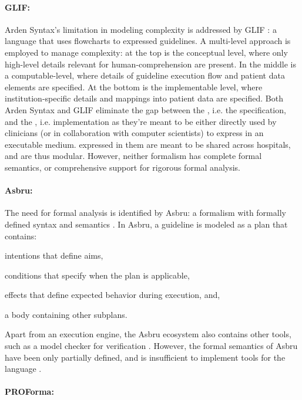 \paragraph{GLIF:}

Arden Syntax's limitation in modeling complexity is addressed by
GLIF \cite{BoxwalaJBI04}: a language that uses flowcharts to expressed
guidelines. A multi-level approach is
employed to manage complexity: at the top is the conceptual level, where
only high-level details relevant for human-comprehension are present. In the
middle is a computable-level, where details of guideline execution flow
and patient data elements are specified. At the bottom is the implementable
level, where institution-specific details and mappings into patient data are
specified. Both Arden Syntax and GLIF  eliminate
the gap between the \BPG{}, i.e. the specification, and the \CIG{}, i.e. implementation as
they're meant to be either directly used by clinicians (or in collaboration with
computer scientists) to express \BPGs{} in an executable medium. \CIGs{}
expressed in them are meant to be shared across hospitals, and are thus modular.
However, neither formalism has complete formal semantics, or comprehensive support for
rigorous formal analysis.

\paragraph{Asbru:}

The need for formal analysis is identified by Asbru: a formalism with formally
defined syntax and semantics \cite{ShaharAMIA96}. In Asbru, a guideline is modeled as a plan
that contains:
\begin{enumerate*}[label=(\roman*)]
  \item intentions that define aims,
  \item conditions that specify when the plan is applicable,
  \item effects that define expected behavior during execution, and,
  \item a body containing other subplans.
\end{enumerate*}
Apart from an execution engine, the Asbru ecosystem also contains
other tools, such as a model checker for verification \cite{BaumlerSPIN06}.
However, the formal semantics of Asbru have been only partially defined, and
is insufficient to implement tools for the language \cite{SuttonAMIA03}.

\paragraph{PROForma:}

